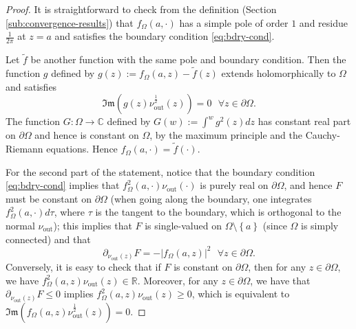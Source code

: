 \documentclass[oneside,english]{amsart}
\numberwithin{equation}{section}
\numberwithin{figure}{section}
\theoremstyle{plain}
\theoremstyle{plain}
\theoremstyle{plain}
\theoremstyle{plain}
\theoremstyle{plain}
\theoremstyle{definition}
\theoremstyle{remark}
\begin{document}
\begin{proof}
It is straightforward to check from the definition (Section \ref{sub:convergence-results})
that $f_{\Omega}\left(a,\cdot\right)$ has a simple pole of order
$1$ and residue $\frac{1}{2\pi}$ at $z=a$ and satisfies the boundary
condition \ref{eq:bdry-cond}.

Let $\tilde{f}$ be another function with the same pole and boundary
condition. Then the function $g$ defined by $g\left(z\right):=f_{\Omega}\left(a,z\right)-\tilde{f}\left(z\right)$
extends holomorphically to $\Omega$ and satisfies 
\[
\Im\mathfrak{m}\left(g\left(z\right)\nu_{\mathrm{out}}^{\frac{1}{2}}\left(z\right)\right)=0\,\,\,\,\forall z\in\partial\Omega.
\]
The function $G:\Omega\to\mathbb{C}$ defined by $G\left(w\right):=\int^{w}g^{2}\left(z\right)dz$
has constant real part on $\partial\Omega$ and hence is constant
on $\Omega$, by the maximum principle and the Cauchy-Riemann equations.
Hence $f_{\Omega}\left(a,\cdot\right)=\tilde{f}\left(\cdot\right)$. 

For the second part of the statement, notice that the boundary condition
\ref{eq:bdry-cond} implies that $f_{\Omega}^{2}\left(a,\cdot\right)\nu_{\mathrm{out}}\left(\cdot\right)$
is purely real on $\partial\Omega$, and hence $F$ must be constant
on $\partial\Omega$ (when going along the boundary, one integrates
$f_{\Omega}^{2}\left(a,\cdot\right)d\tau$, where $\tau$ is the tangent
to the boundary, which is orthogonal to the normal $\nu_{\mathrm{out}}$);
this implies that $F$ is single-valued on $\Omega\setminus\left\{ a\right\} $
(since $\Omega$ is simply connected) and that 
\[
\partial_{\mathfrak{\nu}_{\mathrm{out}}\left(z\right)}F=-\left|f_{\Omega}\left(a,z\right)\right|^{2}\,\,\,\,\forall z\in\partial\Omega.
\]
Conversely, it is easy to check that if $F$ is constant on $\partial\Omega$,
then for any $z\in\partial\Omega$, we have $f_{\Omega}^{2}\left(a,z\right)\nu_{\mathrm{out}}\left(z\right)\in\mathbb{R}$.
Moreover, for any $z\in\partial\Omega$, we have that $\partial_{\nu_{\mathrm{out}}\left(z\right)}F\leq0$
implies $f_{\Omega}^{2}\left(a,z\right)\nu_{\mathrm{out}}\left(z\right)\geq0$,
which is equivalent to $\Im\mathfrak{m}\left(f_{\Omega}\left(a,z\right)\nu_{\mathrm{out}}^{\frac{1}{2}}\left(z\right)\right)=0$. 
\end{proof}
\end{document}
